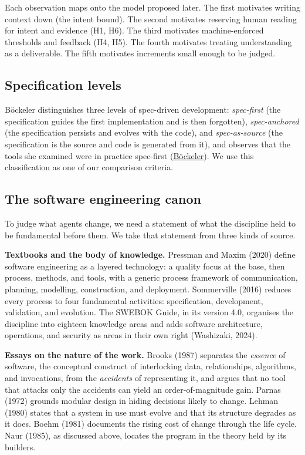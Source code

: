 \documentclass[11pt]{article}
\begin{document}
Each observation maps onto the model proposed later. The first motivates writing context down (the intent bound). The second motivates reserving human reading for intent and evidence (H1, H6). The third motivates machine-enforced thresholds and feedback (H4, H5). The fourth motivates treating understanding as a deliverable. The fifth motivates increments small enough to be judged.

\subsection{Specification levels}

B\"ockeler distinguishes three levels of spec-driven development: \emph{spec-first} (the specification guides the first implementation and is then forgotten), \emph{spec-anchored} (the specification persists and evolves with the code), and \emph{spec-as-source} (the specification is the source and code is generated from it), and observes that the tools she examined were in practice spec-first (\href{https://www.martinfowler.com/articles/exploring-gen-ai/sdd-3-tools.html}{B\"ockeler}). We use this classification as one of our comparison criteria.

\subsection{The software engineering canon}

To judge what agents change, we need a statement of what the discipline held to be fundamental before them. We take that statement from three kinds of source.

\textbf{Textbooks and the body of knowledge.} Pressman and Maxim (2020) define software engineering as a layered technology: a quality focus at the base, then process, methods, and tools, with a generic process framework of communication, planning, modelling, construction, and deployment. Sommerville (2016) reduces every process to four fundamental activities: specification, development, validation, and evolution. The SWEBOK Guide, in its version 4.0, organises the discipline into eighteen knowledge areas and adds software architecture, operations, and security as areas in their own right (Washizaki, 2024).

\textbf{Essays on the nature of the work.} Brooks (1987) separates the \emph{essence} of software, the conceptual construct of interlocking data, relationships, algorithms, and invocations, from the \emph{accidents} of representing it, and argues that no tool that attacks only the accidents can yield an order-of-magnitude gain. Parnas (1972) grounds modular design in hiding decisions likely to change. Lehman (1980) states that a system in use must evolve and that its structure degrades as it does. Boehm (1981) documents the rising cost of change through the life cycle. Naur (1985), as discussed above, locates the program in the theory held by its builders.
\end{document}
